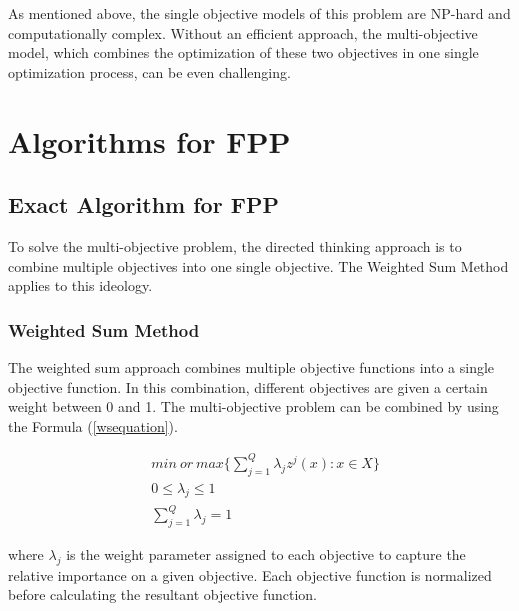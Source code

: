 \documentclass[10pt,journal,compsoc]{IEEEtran}
\newcommand{\Eq}[1]{(\ref{#1})}
\begin{document}

As mentioned above, the single objective models of this problem are NP-hard and computationally complex. Without an efficient approach, the multi-objective model, which combines the optimization of these two objectives in one single optimization process, can be even challenging.

\section{Algorithms for FPP}\label{alfpp}

\subsection{Exact Algorithm for FPP}
To solve the multi-objective problem, the directed thinking approach is to combine multiple objectives into one single objective. The Weighted Sum Method applies to this ideology.

\subsubsection{Weighted Sum Method}
The weighted sum approach combines multiple objective functions into a single objective function. In this combination, different objectives are given a certain weight between 0 and 1. The multi-objective problem can be combined by using the Formula \Eq{wsequation}.

\begin{align}
&min\ or\ max \bigg\{\sum_{j=1}^Q \lambda_j z^j (x) : x \in X \bigg\}\label{wsequation}\\
&0\leq \lambda_j \leq 1\\
&\sum_{j=1}^Q \lambda_j = 1
\end{align}

where $\lambda_j$ is the weight parameter assigned to each objective to capture the relative importance on a given objective. Each objective function is normalized before calculating the resultant objective function. %
\end{document}
